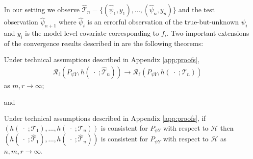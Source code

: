In our setting we observe $ \widehat{\mathcal{T}}_{n} = \{(\widehat{\psi}_{1}, y_{1}), \hdots, (\widehat{\psi}_{n}, y_{n})\} $ and the test observation $ \widehat{\psi}_{n+1} $ where $ \widehat{\psi}_{i} $ is an errorful observation of the true-but-unknown $ \psi_{i} $ and $ y_{i} $ is the model-level covariate corresponding to $ f_{i} $. 
Two important extensions of the convergence results described in \citep{aranyak} are the following theorems:
\begin{theorem}
\label{thm:rule-convergence}
    Under technical assumptions described in Appendix \ref{app:proofs}, \begin{align*}
    \mathcal{R}_{\ell}(P_{\psi Y}, h(\; \cdot \;; \widehat{\mathcal{T}}_{n})) \to \mathcal{R}_{\ell}(P_{\psi Y}, h(\; \cdot \;; \mathcal{T}_{n})) 
    \end{align*} as $ m, r \to \infty $;
\end{theorem}
and
\begin{theorem}
\label{thm:consistency}
    Under technical assumptions described in Appendix \ref{app:proofs}, if $ (h(\; \cdot \;; \mathcal{T}_{1}), \hdots, h(\; \cdot \;; \mathcal{T}_{n})) $ is consistent for $ P_{\psi Y} $ with respect to
    $ \mathcal{H} $ then $ (h(\; \cdot \;; \widehat{\mathcal{T}}_{1}), \hdots, h(\; \cdot \;; \widehat{\mathcal{T}}_{n})) $ is consistent for 
    $ P_{\psi Y} $ 
    with respect to
    $ \mathcal{H} $ as $ n, m, r \to \infty $.
\end{theorem}
